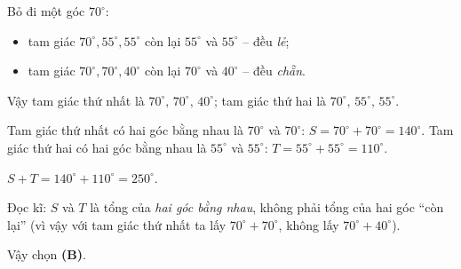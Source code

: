 {
Bỏ đi một góc $70^\circ$:
\begin{itemize}[leftmargin=1.3em,itemsep=0pt,topsep=0pt]
  \item tam giác $70^\circ,55^\circ,55^\circ$ còn lại $55^\circ$ và $55^\circ$ -- đều \emph{lẻ};
  \item tam giác $70^\circ,70^\circ,40^\circ$ còn lại $70^\circ$ và $40^\circ$ -- đều \emph{chẵn}.
\end{itemize}
Vậy tam giác thứ nhất là $70^\circ,\,70^\circ,\,40^\circ$; tam giác thứ hai là $70^\circ,\,55^\circ,\,55^\circ$.

Tam giác thứ nhất có hai góc bằng nhau là $70^\circ$ và $70^\circ$: $S=70^\circ+70^\circ=140^\circ$.
Tam giác thứ hai có hai góc bằng nhau là $55^\circ$ và $55^\circ$: $T=55^\circ+55^\circ=110^\circ$.

$S+T=140^\circ+110^\circ=250^\circ$.
\begin{warnbox}Đọc kĩ: $S$ và $T$ là tổng của \emph{hai góc bằng nhau}, không phải tổng của hai góc ``còn lại'' (vì vậy với tam giác thứ nhất ta lấy $70^\circ+70^\circ$, không lấy $70^\circ+40^\circ$).\end{warnbox}
Vậy chọn \textbf{(B)}.
}

